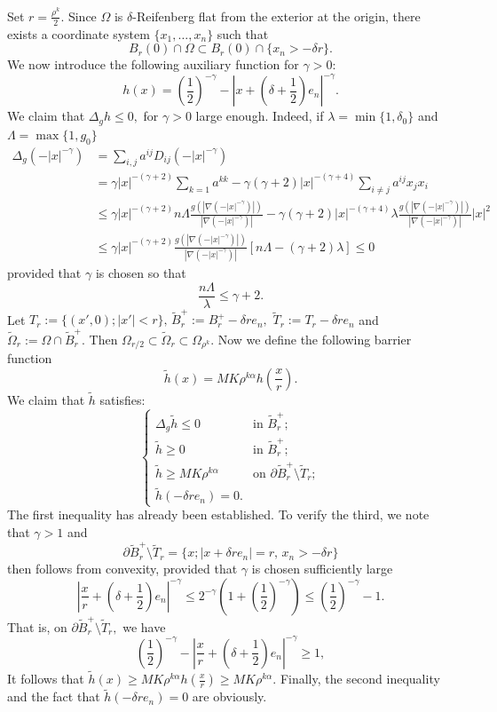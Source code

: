 \documentclass[11pt, leqno]{article}
\theoremstyle{definition}
\theoremstyle{remark}
\numberwithin{equation}{section}
\begin{document}
 Set $r=\frac{\rho^k}{2}.$ Since \(\Omega\) is \(\delta\)-Reifenberg flat from the exterior at the origin, there exists a coordinate system \(\{x_1,\ldots,x_n\}\) such that
 $$B_r(0)\cap\Omega\subset B_r(0)\cap\{x_n>-\delta r\}.  $$
 We now introduce the following auxiliary function for $\gamma>0$:
 \begin{equation}
     h(x)=\left(\frac{1}{2}\right)^{-\gamma} - \left\vert x+\left(\delta+ \frac{1}{2}\right)e_n\right\vert^{-\gamma}.
 \end{equation}
We claim that $\Delta_gh \leq 0,$ for $\gamma>0$ large enough. Indeed, if $\lambda=\min\{1,\delta_0\}$ and $\Lambda=\max\{1,g_0\}$
\begin{align*}
    \Delta_g(-|x|^{-\gamma}) &= \sum_{i,j}a^{ij}D_{ij}(-|x|^{-\gamma})\\
    &= \gamma|x|^{-(\gamma+2)}\sum_{k=1}a^{kk} - \gamma(\gamma+2)|x|^{-(\gamma+4)}\sum_{i\neq j}a^{ij}x_jx_i\\
    &\leq \gamma|x|^{-(\gamma+2)}n\Lambda\frac{g(|\nabla(-|x|^{-\gamma})|)}{|\nabla(-|x|^{-\gamma})|} - \gamma(\gamma +2)|x|^{-(\gamma+4)}\lambda\frac{g(|\nabla(-|x|^{-\gamma})|)}{|\nabla(-|x|^{-\gamma})|}|x|^2\\
    &\leq \gamma|x|^{-(\gamma+2)}\frac{g(|\nabla(-|x|^{-\gamma})|)}{|\nabla(-|x|^{-\gamma})|}[n\Lambda - (\gamma+2)\lambda]\leq 0
\end{align*}
provided that \(\gamma\) is chosen so that
 $$\frac{n\Lambda}{\lambda}\leq \gamma +2. $$
Let $T_r:=\{(x',0); |x'|<r\}, \, \tilde{B}_r^+:=B_r^+ - \delta re_n,\,\, \tilde{T}_r:=T_r-\delta re_n$ and $\tilde{\Omega}_r:=\Omega\cap \tilde{B}_r^+.$ Then $\Omega_{r/2}\subset \tilde{\Omega}_r\subset \Omega_{\rho^k}.$ Now we define the following barrier function
 \begin{equation}\label{barrier}
     \tilde{h}(x)= MK\rho^{k\alpha}h\left(\frac{x}{r}\right).
 \end{equation}
We claim that $\tilde{h}$ satisfies:
\[
\begin{cases}
    \Delta_g\tilde{h}\leq 0 & \text{in } \tilde{B}_r^+; \\
    \tilde{h}\geq 0 & \text{in } \tilde{B}_r^+; \\
    \tilde{h}\geq MK\rho^{k\alpha} & \text{on } \partial\tilde{B}_r^+ \setminus \tilde{T}_r; \\
    \tilde{h}(-\delta r e_n) = 0.
\end{cases}
\]
The first inequality has already been established. To verify the third, we note that \(\gamma>1\) and
 $$\partial\tilde{B}_r^+\setminus \tilde{T}_r=\{x; |x+\delta re_n|=r,\,x_n>-\delta r\}$$
then follows from convexity, provided that \(\gamma\) is chosen sufficiently large
$$\left\vert \frac{x}{r}+ \left(\delta+\frac{1}{2}\right)e_n\right\vert^{-\gamma}\leq 2^{-\gamma}\left( 1+\left(\frac{1}{2}\right)^{-\gamma} \right)\leq \left(\frac{1}{2}\right)^{-\gamma}-1.$$
That is, on $\partial\tilde{B}_r^+ \setminus \tilde{T}_r,$ we have
$$\left(\frac{1}{2}\right)^{-\gamma} - \left\vert \frac{x}{r}+ \left(\delta+\frac{1}{2}\right)e_n\right\vert^{-\gamma}\geq 1,  $$
It follows that $\tilde{h}(x)\geq MK\rho^{k\alpha}h\left(\frac{x}{r}\right)\geq MK\rho^{k\alpha}.$
Finally, the second inequality and the fact that $\tilde{h}(-\delta re_n)=0$ are obviously.
\end{document}
